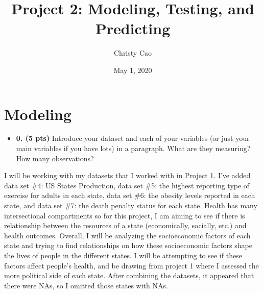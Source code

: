 \documentclass[]{article}
\title{Project 2: Modeling, Testing, and Predicting}
\author{Christy Cao}
\date{May 1, 2020}
\newenvironment{Shaded}{\begin{snugshade}}{\end{snugshade}}
\newcommand{\CommentTok}[1]{\textcolor[rgb]{0.56,0.35,0.01}{\textit{#1}}}
\newcommand{\DataTypeTok}[1]{\textcolor[rgb]{0.13,0.29,0.53}{#1}}
\newcommand{\DecValTok}[1]{\textcolor[rgb]{0.00,0.00,0.81}{#1}}
\newcommand{\KeywordTok}[1]{\textcolor[rgb]{0.13,0.29,0.53}{\textbf{#1}}}
\newcommand{\NormalTok}[1]{#1}
\newcommand{\StringTok}[1]{\textcolor[rgb]{0.31,0.60,0.02}{#1}}
\providecommand{\tightlist}{%
  \setlength{\itemsep}{0pt}\setlength{\parskip}{0pt}}
\begin{document}
\maketitle

\hypertarget{modeling}{%
\section{Modeling}\label{modeling}}

\begin{itemize}
\tightlist
\item
  \textbf{0. (5 pts)} Introduce your dataset and each of your variables
  (or just your main variables if you have lots) in a paragraph. What
  are they measuring? How many observations?
\end{itemize}

I will be working with my datasets that I worked with in Project 1. I've
added data set \#4: US States Production, data set \#5: the highest
reporting type of exercise for adults in each state, data set \#6: the
obesity levels reported in each state, and data set \#7: the death
penalty status for each state. Health has many intersectional
compartments so for this project, I am aiming to see if there is
relationship between the resources of a state (economically, socially,
etc.) and health outcomes. Overall, I will be analyzing the
socioeconomic factors of each state and trying to find relationships on
how these socioeconomic factors shape the lives of people in the
different states. I will be attempting to see if these factors affect
people's health, and be drawing from project 1 where I assessed the more
political side of each state. After combining the datasets, it appeared
that there were NAs, so I omitted those states with NAs.

\begin{Shaded}
\end{Shaded}
\end{document}

